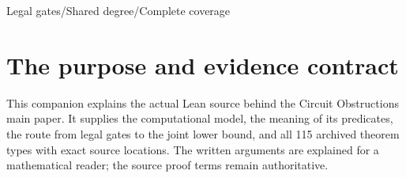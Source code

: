 
\newcommand{\TC}{\operatorname{tc}}
\newcommand{\Deg}{\operatorname{DegreeLE}}
\newcommand{\x}{\mathbin{\oplus}}
\newcommand{\pathref}[1]{{\small\texttt{\detokenize{#1}}}}
\newcommand{\pagehead}[2]{\clearpage\section*{#1}\addcontentsline{toc}{section}{#1}{\small\color{teal}\textsc{#2}}\par\medskip}
\newenvironment{statusbox}[1]{\begin{quote}\small\color{ink}\textbf{#1}\par}{\end{quote}}

\usepackage{komorebi-publication}
\renewcommand{\KomorebiTitle}{Circuit Obstructions}
\renewcommand{\KomorebiSubtitle}{Restoration, complete covers, and the limits of exact projection}
\renewcommand{\KomorebiSeries}{Research library}
\renewcommand{\KomorebiKind}{Lean and evidence guide}
\renewcommand{\KomorebiEdition}{Standardized publication edition / 8 October 2026}
\renewcommand{\KomorebiShortTitle}{Circuit Obstructions}
\renewcommand{\KomorebiTitleSize}{38}
\renewcommand{\KomorebiTitleLeading}{43}
\renewcommand{\KomorebiProfile}{classical}
\renewcommand{\KomorebiOrientation}{portrait}
\KomorebiSetup

\KomorebiCover
{}

\hypersetup{pageanchor=false}
{Legal gates\enspace /\enspace Shared degree\enspace /\enspace Complete coverage}
\hypersetup{pageanchor=true}
\section*{The purpose and evidence contract}
This companion explains the actual Lean source behind the Circuit Obstructions
main paper. It supplies the computational model, the meaning of its predicates,
the route from legal gates to the joint lower bound, and all 115 archived
theorem types with exact source locations. The written arguments are explained
for a mathematical reader; the source proof terms remain authoritative.

